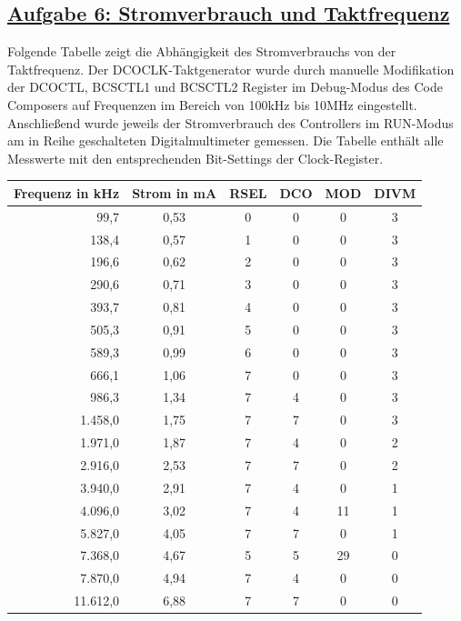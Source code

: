 \subsection
{\href{http://cst.mi.fu-berlin.de/intern/19606-P-MPP/Aufgaben/040202.html}
{Aufgabe 6: Stromverbrauch und Taktfrequenz}}

Folgende Tabelle zeigt die Abhängigkeit des Stromverbrauchs von der Taktfrequenz. Der DCO\-CLK-Taktgenerator wurde durch manuelle Modifikation der DCOCTL, BCSCTL1 und BCSCTL2 Register im Debug-Modus des Code Composers auf Frequenzen im Bereich von 100kHz bis 10MHz eingestellt. Anschließend wurde jeweils der Stromverbrauch des Controllers im RUN-Modus am in Reihe geschalteten Digitalmultimeter gemessen. Die Tabelle enthält alle Messwerte mit den entsprechenden Bit-Settings der Clock-Register.

\begin{center}
\begin{tabular}{|r|c|c|c|c|c|}\hline
Frequenz in kHz	&	Strom in mA	&	RSEL	&	DCO	&	MOD	&	DIVM \\\hline

99,7	&	0,53	&	0	&	0	&	0	&	3 \\\hline
138,4	&	0,57	&	1	&	0	&	0	&	3 \\\hline
196,6	&	0,62	&	2	&	0	&	0	&	3 \\\hline
290,6	&	0,71	&	3	&	0	&	0	&	3 \\\hline
393,7	&	0,81	&	4	&	0	&	0	&	3 \\\hline
505,3	&	0,91	&	5	&	0	&	0	&	3 \\\hline
589,3	&	0,99	&	6	&	0	&	0	&	3 \\\hline
666,1	&	1,06	&	7	&	0	&	0	&	3 \\\hline
986,3	&	1,34	&	7	&	4	&	0	&	3 \\\hline
1.458,0	&	1,75	&	7	&	7	&	0	&	3 \\\hline
1.971,0	&	1,87	&	7	&	4	&	0	&	2 \\\hline
2.916,0	&	2,53	&	7	&	7	&	0	&	2 \\\hline
3.940,0	&	2,91	&	7	&	4	&	0	&	1 \\\hline
4.096,0	&	3,02	&	7	&	4	&	11	&	1 \\\hline
5.827,0	&	4,05	&	7	&	7	&	0	&	1 \\\hline
7.368,0	&	4,67	&	5	&	5	&	29	&	0 \\\hline
7.870,0	&	4,94	&	7	&	4	&	0	&	0 \\\hline
11.612,0	&	6,88	&	7	&	7	&	0	&	0 \\\hline

\end{tabular}
\end{center}

